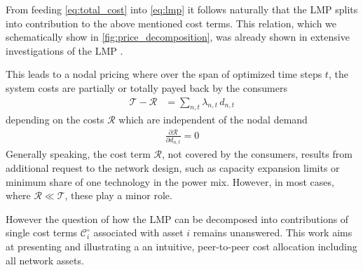 \documentclass[11pt,twocolumn]{article}
\newcommand{\pdv}[2]{\frac{\partial #1}{\partial #2}}
\newcommand{\lmp}[1][n]{\lambda_{#1,t}}
\newcommand{\demand}[1][n]{d_{#1,t}}
\newcommand{\totalcost}{\mathcal{T}}
\newcommand{\cost}[1][\circ]{\mathcal{C}^{#1}}
\newcommand{\remainingcost}{\mathcal{R}}
\begin{document}
From feeding \cref{eq:total_cost} into \cref{eq:lmp} it follows naturally that the LMP splits into contribution to the above mentioned cost terms. 
This relation, which we schematically show in \cref{fig:price_decomposition}, was already shown in extensive investigations of the LMP \cite{schweppe_spot_1988}. 




% 
This leads to a nodal pricing where over the span of optimized time steps $t$, the system costs are partially or totally payed back by the consumers 
\begin{align}
\totalcost - \remainingcost &=  \sum_{n,t} \lmp \, \demand
\label{eq:total_revenue}
\end{align}
depending on the costs $\remainingcost$ which are independent of the nodal demand  
\begin{align}
 \pdv{\remainingcost}{\demand} = 0
\end{align}
% 
Generally speaking, the cost term $\remainingcost$, not covered by the consumers, results from additional request to the network design, such as capacity expansion limits or minimum share of one technology in the power mix. However, in most cases, where $\remainingcost \ll  \totalcost$, these play a minor role. 

However the question of how the LMP can be decomposed into contributions of single cost terms $\cost_{i}$ associated with asset $i$ remains unanswered. This work aims at presenting and illustrating a an intuitive, peer-to-peer cost allocation including all network assets. 



    
\end{document}
